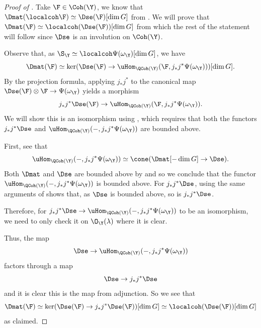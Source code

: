 \documentclass{amsart}
\begin{document}
  \begin{proof}[Proof of ]
    Take \(\F \in \Coh(\Y)\),
    we know that \(\Dmat(\localcoh \F) \simeq \Dse(\F)[\dim G]\)
    from .
    We will prove that \(\Dmat(\F) \simeq \localcoh(\Dse(\F))[\dim G]\)
    from which the rest of the statement will follow since \(\Dse\)
    is an involution on \(\Coh(\Y)\).

    Observe that, as \(\S_\Y \simeq \localcoh \Psi(\omega_\Y)[\dim G]\), we have
    \begin{displaymath}
      \Dmat(\F) \simeq \ker(\Dse(\F) \to \uHom_{\QCoh(\Y)}(\F, j_\ast j^\ast \Psi(\omega_\Y)))[\dim G].
    \end{displaymath}
    By the projection formula, applying \(j_\ast j^\ast\)
    to the canonical map \(\Dse(\F) \otimes \F \to \Psi(\omega_\Y)\)
    yields a morphism
    \begin{displaymath}
      j_\ast j^\ast \Dse(\F) \to \uHom_{\QCoh(\Y)}(\F, j_\ast j^\ast \Psi(\omega_\Y)).
    \end{displaymath}
    We will show this is an isomorphism using ,
    which requires that both the functors \(j_\ast j^\ast \Dse\) and
    \(\uHom_{\QCoh(\Y)}(-, j_\ast j^\ast \Psi(\omega_\Y))\)
    are bounded above.

    First, see that
    \begin{displaymath}
      \uHom_{\QCoh(\Y)}(-, j_\ast j^\ast \Psi(\omega_\Y)) \simeq \cone(\Dmat[-\dim G] \to \Dse).
    \end{displaymath}
    Both \(\Dmat\) and \(\Dse\) are bounded above by  and 
    so we conclude that the functor \(\uHom_{\QCoh(\Y)}(-, j_\ast j^\ast \Psi(\omega_\Y))\) is bounded above.
    For \(j_\ast j^\ast \Dse\),
    using the same arguments of  shows that,
    as \(\Dse\) is bounded above, so is \(j_\ast j^\ast \Dse\).

    Therefore, for \(j_\ast j^\ast \Dse \to \uHom_{\QCoh(\Y)}(-, j_\ast j^\ast \Psi(\omega_\Y))\)
    to be an isomorphism, we need to only check it on \(\O_\Y(\lambda)\)
    where it is clear.

    Thus, the map
    \begin{displaymath}
      \Dse \to \uHom_{\QCoh(\Y)}(-, j_\ast j^\ast \Psi(\omega_\Y))
    \end{displaymath}
    factors through a map
    \begin{displaymath}
      \Dse \to j_\ast j^\ast \Dse
    \end{displaymath}
    and it is clear this is the map from adjunction.
    So we see that
    \begin{displaymath}
      \Dmat(\F) \simeq \ker(\Dse(\F) \to j_\ast j^\ast \Dse(\F))[\dim G] \simeq \localcoh(\Dse(\F))[\dim G]
    \end{displaymath}
    as claimed.
  \end{proof}
  
\end{document}
